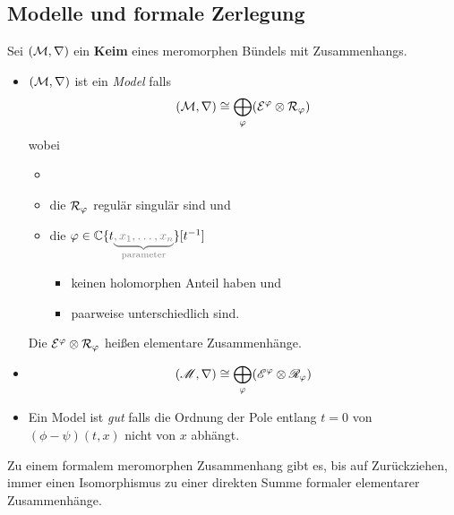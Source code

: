 \subsection{Modelle und formale Zerlegung}%
\begin{defn}
  Sei $(\mathcal{M},\nabla)$ ein \textbf{Keim} eines meromorphen Bündels mit
  Zusammenhangs.
  \begin{itemize}
    \item $(\mathcal{M},\nabla)$ ist ein \emph{Model} 
      falls
      \[
        (\mathcal{M},\nabla)
        \cong
        \bigoplus_\varphi(\mathcal{E}^\varphi\otimes\mathcal{R}_\varphi)
      \]
      wobei
      \begin{itemize}
        \item {}
        \item die $\mathcal{R}_\varphi$ regulär singulär sind und
        \item die
          $\phi\in\C\{t\textcolor{gray}{\underset{\text{parameter}}
            {\underbrace{,x_1,\ldots,x_n}}}\}[t^{-1}]$
          \begin{itemize}
            \item keinen holomorphen Anteil haben und
            \item paarweise unterschiedlich sind.
          \end{itemize}
      \end{itemize}
      Die $\mathcal{E}^\varphi\otimes\mathcal{R}_\varphi$ heißen elementare Zusammenhänge.
    \item {}
      \[
        (\mathscr{M},\nabla)
        \cong
        \bigoplus_\varphi(\mathscr{E}^\varphi\otimes\mathscr{R}_\varphi)
      \]
    \item Ein Model ist \emph{gut} falls die Ordnung der Pole entlang $t=0$ von
      $(\phi-\psi)(t,x)$ nicht von $x$ abhängt.
  \end{itemize}
\end{defn}
\begin{thm}
  Zu einem formalem meromorphen Zusammenhang gibt es, bis auf Zurückziehen,
  immer einen Isomorphismus zu einer direkten Summe formaler elementarer
  Zusammenhänge.
\end{thm}
